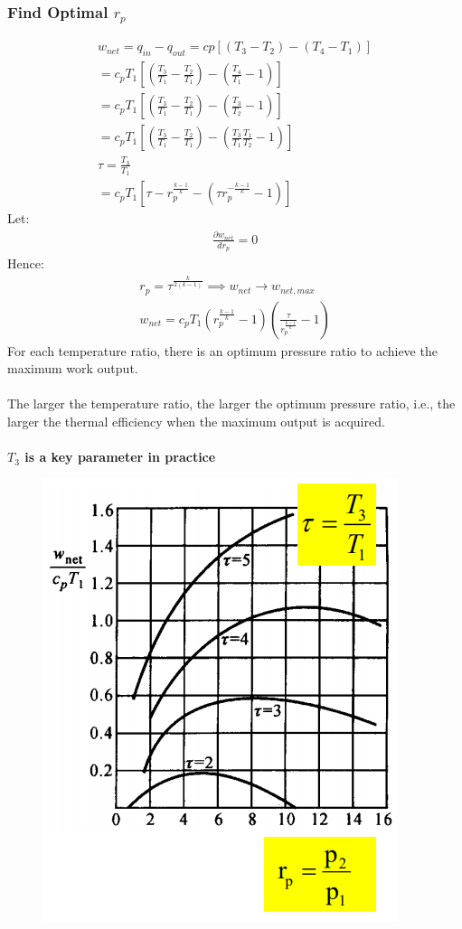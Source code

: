 \documentclass[class=report, crop=false, 12pt,a4paper]{standalone}
\numberwithin{equation}{section}
\begin{document}
\subsubsection{Find Optimal $r_p$}
\begin{gather}
  w_{net} = q_{in} - q_{out} = cp\left[(T_3-T_2) - (T_4-T_1)\right] \\[5pt]
  = c_p T_1\left[\left(\frac{T_3}{T_1}-\frac{T_2}{T_1}\right)-\left(\frac{T_4}{T_1}-1\right)\right] \\[5pt]
  = c_p T_1\left[\left(\frac{T_3}{T_1}-\frac{T_2}{T_1}\right)-\left(\frac{T_3}{T_2}-1\right)\right] \\[5pt]
  = c_p T_1\left[\left(\frac{T_3}{T_1}-\frac{T_2}{T_1}\right)-\left(\frac{T_3}{T_1}\frac{T_1}{T_2}-1\right)\right] \\[5pt]
  \tau = \frac{T_3}{T_1} \\[5pt]
  = c_p T_1\left[\tau - r_p^{\frac{k-1}{k}} - \left(\tau r_p^{-\frac{k-1}{k}}-1\right)\right]
\end{gather}
Let:
\begin{gather}
  \frac{\partial w_{net}}{dr_p} = 0
\end{gather}
Hence:
\begin{gather}
  r_p = \tau^{\frac{k}{2(k-1)}} \implies w_{net} \rightarrow w_{net,max} \\[5pt]
  w_{net} = c_p T_1 \left(r_p^{\frac{k-1}{k}}-1\right)\left(\frac{\tau}{r_p^{\frac{k-1}{k}}}-1\right)
\end{gather}
For each temperature ratio, there is an optimum pressure ratio to achieve the maximum work output. \\\\
The larger the temperature ratio, the larger the optimum pressure ratio, i.e., the larger the thermal efficiency when the maximum output is acquired. \\\\
\textbf{$T_3$ is a key parameter in practice}
\begin{figure}[H]
  \centering
  \includegraphics[width = 0.4 \textwidth]{../img/diagram161.png}
  \caption{}
\end{figure}
\end{document}
